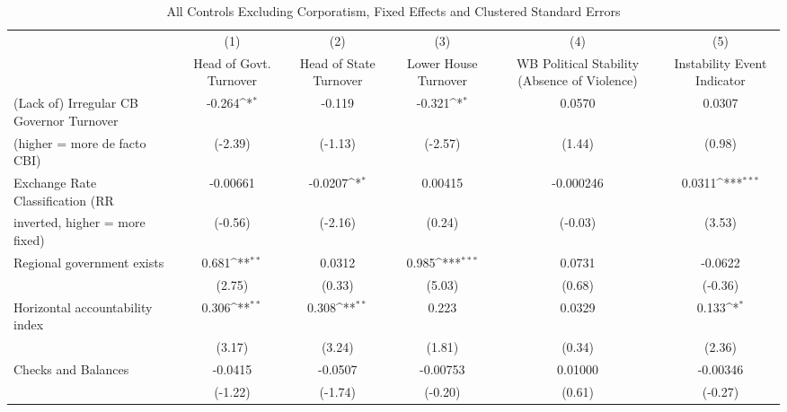 \begin{table}[htbp]\centering
\def\sym#1{\ifmmode^{#1}\else\(^{#1}\)\fi}
\caption{All Controls Excluding Corporatism, Fixed Effects and Clustered Standard Errors \label{nccmultIndFEDF}}
\begin{tabular}{l*{5}{c}}
\toprule
                                        &\multicolumn{1}{c}{(1)}&\multicolumn{1}{c}{(2)}&\multicolumn{1}{c}{(3)}&\multicolumn{1}{c}{(4)}&\multicolumn{1}{c}{(5)}\\
                                        &\multicolumn{1}{c}{Head of Govt. Turnover}&\multicolumn{1}{c}{Head of State Turnover}&\multicolumn{1}{c}{Lower House Turnover}&\multicolumn{1}{c}{WB Political Stability (Absence of Violence)}&\multicolumn{1}{c}{Instability Event Indicator}\\
\midrule
(Lack of) Irregular CB Governor Turnover&   -0.264\sym{*}  &   -0.119         &   -0.321\sym{*}  &   0.0570         &   0.0307         \\
(higher = more de facto CBI)            &  (-2.39)         &  (-1.13)         &  (-2.57)         &   (1.44)         &   (0.98)         \\
\addlinespace
Exchange Rate Classification (RR        & -0.00661         &  -0.0207\sym{*}  &  0.00415         &-0.000246         &   0.0311\sym{***}\\
inverted, higher = more fixed)          &  (-0.56)         &  (-2.16)         &   (0.24)         &  (-0.03)         &   (3.53)         \\
\addlinespace
Regional government exists              &    0.681\sym{**} &   0.0312         &    0.985\sym{***}&   0.0731         &  -0.0622         \\
                                        &   (2.75)         &   (0.33)         &   (5.03)         &   (0.68)         &  (-0.36)         \\
\addlinespace
Horizontal accountability index         &    0.306\sym{**} &    0.308\sym{**} &    0.223         &   0.0329         &    0.133\sym{*}  \\
                                        &   (3.17)         &   (3.24)         &   (1.81)         &   (0.34)         &   (2.36)         \\
\addlinespace
Checks and Balances                     &  -0.0415         &  -0.0507         & -0.00753         &  0.01000         & -0.00346         \\
                                        &  (-1.22)         &  (-1.74)         &  (-0.20)         &   (0.61)         &  (-0.27)         \\

\end{tabular}
\end{table}

